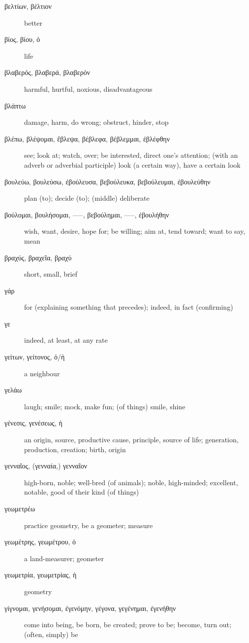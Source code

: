 \documentclass[12pt,letterpaper]{article}
\begin{document}
\begin{description}
    \item[\textgreek{βελτίων, βέλτιον}] \marginnote{*}better
    \item[\textgreek{βίος, βίου, ὁ}] \marginnote{*}life
    \item[\textgreek{βλαβερός, βλαβερά, βλαβερόν}] harmful, hurtful, noxious, disadvantageous
    \item[\textgreek{βλάπτω}] damage, harm, do wrong; obstruct, hinder, stop
    \item[\textgreek{βλέπω, βλέψομαι, ἔβλεψα, βέβλεφα, βέβλεμμαι, ἐβλέφθην}] \marginnote{*}see; look at; watch, over; be interested, direct one's attention; (with an adverb or adverbial participle) look (a certain way), have a certain look
    \item[\textgreek{βουλεύω, βουλεύσω, ἐβούλευσα, βεβούλευκα, βεβούλευμαι, ἐβουλεύθην}] \marginnote{*}plan (to); decide (to); (middle) deliberate
    \item[\textgreek{βούλομαι, βουλήσομαι, –––, βεβούλημαι, –––, ἐβουλήθην}] \marginnote{*}wish, want, desire, hope for; be willing; aim at, tend toward; want to say, mean
    \item[\textgreek{βραχύς, βραχεῖα, βραχύ}] \marginnote{*}short, small, brief
    \item[\textgreek{γάρ}] \marginnote{*}for (explaining something that precedes); indeed, in fact (confirming)
    \item[\textgreek{γε}] \marginnote{*}indeed, at least, at any rate
    \item[\textgreek{γείτων, γείτονος, ὁ/ἡ}] a neighbour
    \item[\textgreek{γελάω}] laugh; smile; mock, make fun; (of things) smile, shine
    \item[\textgreek{γένεσις, γενέσεως, ἡ}] an origin, source, productive cause, principle, source of life; generation, production, creation; birth, origin
    \item[\textgreek{γενναῖος, (γενναία,) γενναῖον}] high-born, noble; well-bred (of animals); noble, high-minded; excellent, notable, good of their kind (of things)
    \item[\textgreek{γεωμετρέω}] practice geometry, be a geometer; measure
    \item[\textgreek{γεωμέτρης, γεωμέτρου, ὁ}] a land-measurer; geometer
    \item[\textgreek{γεωμετρία, γεωμετρίας, ἡ}] geometry
    \item[\textgreek{γίγνομαι, γενήσομαι, ἐγενόμην, γέγονα, γεγένημαι, ἐγενήθην}] \marginnote{*}come into being, be born, be created; prove to be; become, turn out; (often, simply) be

\end{description}
\end{document}
